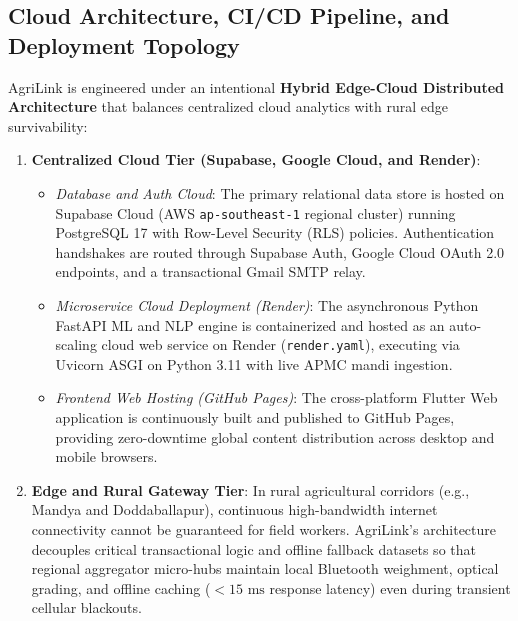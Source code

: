 \subsection{Cloud Architecture, CI/CD Pipeline, and Deployment Topology}
\label{subsec:Cloud_CI_CD}
AgriLink is engineered under an intentional \textbf{Hybrid Edge-Cloud Distributed Architecture} that balances centralized cloud analytics with rural edge survivability:
\begin{enumerate}
    \item \textbf{Centralized Cloud Tier (Supabase, Google Cloud, and Render)}:
    \begin{itemize}
        \item \textit{Database and Auth Cloud}: The primary relational data store is hosted on Supabase Cloud (AWS \texttt{ap-southeast-1} regional cluster) running PostgreSQL 17 with Row-Level Security (RLS) policies. Authentication handshakes are routed through Supabase Auth, Google Cloud OAuth 2.0 endpoints, and a transactional Gmail SMTP relay.
        \item \textit{Microservice Cloud Deployment (Render)}: The asynchronous Python FastAPI ML and NLP engine is containerized and hosted as an auto-scaling cloud web service on Render (\texttt{render.yaml}), executing via Uvicorn ASGI on Python 3.11 with live APMC mandi ingestion.
        \item \textit{Frontend Web Hosting (GitHub Pages)}: The cross-platform Flutter Web application is continuously built and published to GitHub Pages, providing zero-downtime global content distribution across desktop and mobile browsers.
    \end{itemize}
    
    \item \textbf{Edge and Rural Gateway Tier}: In rural agricultural corridors (e.g., Mandya and Doddaballapur), continuous high-bandwidth internet connectivity cannot be guaranteed for field workers. AgriLink's architecture decouples critical transactional logic and offline fallback datasets so that regional aggregator micro-hubs maintain local Bluetooth weighment, optical grading, and offline caching ($< 15\text{ ms}$ response latency) even during transient cellular blackouts.
    

\end{enumerate}
